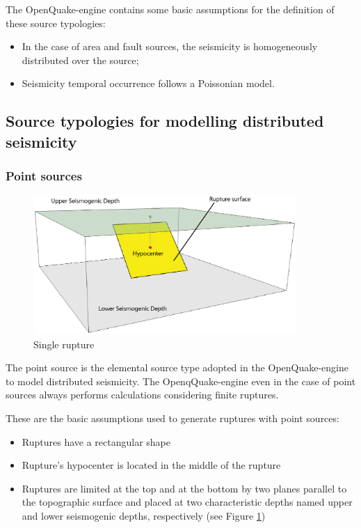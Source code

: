 The OpenQuake-engine contains some basic assumptions for the 
definition of these source typologies:
\begin{itemize}
	\item In the case of area and fault sources, the seismicity 
        is homogeneously distributed over the source; 	
	\item Seismicity temporal occurrence follows a Poissonian model. 
\end{itemize}
\subsection{Source typologies for modelling distributed seismicity}
\subsubsection{Point sources}
\label{hazard:seismic_source_types:pointSources}
\begin{figure}[!ht]
\centering
\includegraphics[width=10cm]{./figures/hazard/single_rupture.eps}
\caption{Single rupture}
\label{fig:single_rupture}
\end{figure}
The point source is the elemental source type adopted in the OpenQuake-engine 
to model distributed seismicity. The OpenqQuake-engine even in the case of 
point sources always performs calculations considering finite ruptures.

These are the basic assumptions used to generate ruptures with point 
sources:
%
\begin{itemize}
	\item Ruptures have a rectangular shape
	\item Rupture's hypocenter is located in the middle of the rupture
	\item Ruptures are limited at the top and at the bottom by two planes 
	parallel to the topographic surface and placed at two characteristic 
	depths named upper and lower seismogenic depths, respectively (see 
	Figure \ref{fig:single_rupture})
\end{itemize} 
%
